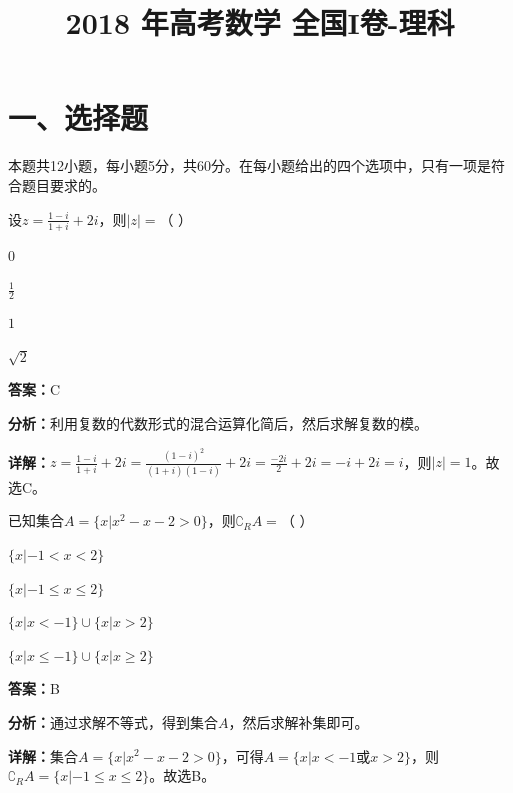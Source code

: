 ﻿\title{2018 年高考数学 全国I卷-理科}
\date{}
\maketitle

\section*{一、选择题}
本题共12小题，每小题5分，共60分。在每小题给出的四个选项中，只有一项是符合题目要求的。

\begin{question}[points=5]
设$z=\frac{1-i}{1+i}+2i$，则$|z|=$（    ）
\begin{choices}
  \item $0$
  \item $\frac{1}{2}$
  \item $1$
  \item $\sqrt{2}$
\end{choices}
\begin{solution}
\textbf{答案：}C

\textbf{分析：}利用复数的代数形式的混合运算化简后，然后求解复数的模。

\textbf{详解：}$z=\frac{1-i}{1+i}+2i=\frac{(1-i)^2}{(1+i)(1-i)}+2i=\frac{-2i}{2}+2i=-i+2i=i$，则$|z|=1$。故选C。
\end{solution}
\end{question}

\begin{question}[points=5]
已知集合$A=\{x|x^2-x-2>0\}$，则$\complement_RA=$（    ）
\begin{choices}
  \item $\{x|-1<x<2\}$
  \item $\{x|-1\leq x\leq2\}$
  \item $\{x|x<-1\}\cup\{x|x>2\}$
  \item $\{x|x\leq-1\}\cup\{x|x\geq2\}$
\end{choices}
\begin{solution}
\textbf{答案：}B

\textbf{分析：}通过求解不等式，得到集合$A$，然后求解补集即可。

\textbf{详解：}集合$A=\{x|x^2-x-2>0\}$，可得$A=\{x|x<-1\text{或}x>2\}$，则$\complement_RA=\{x|-1\leq x\leq2\}$。故选B。
\end{solution}
\end{question}

